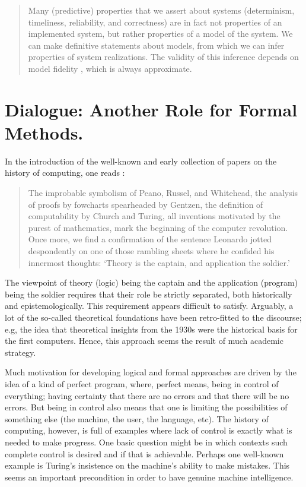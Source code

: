 \documentclass[]{article}
\begin{document}
\begin{quote}
	Many (predictive) properties that we assert about systems (determinism, timeliness, reliability, and correctness) are in fact not properties of an implemented system, but rather properties of a model of	the system.
	We can make definitive statements about
	models, from which we can infer properties of system realizations. The validity of this inference depends on model fidelity , which is always approximate.
\end{quote}



\section{Dialogue: Another Role for Formal Methods.}

{\color{red}{Passage inspired by Liesbeth}}


In the introduction of the well-known and early collection of papers on the
history of computing, one reads \cite[p???]{??}:

\begin{quote}
The improbable symbolism of Peano, Russel, and Whitehead, the
analysis of proofs by fowcharts spearheaded by Gentzen, the definition of computability by Church and Turing, all inventions motivated by the purest of mathematics, mark the beginning of the computer revolution. Once more, we find a confirmation of the sentence Leonardo jotted despondently on one of those rambling sheets where he confided his innermost thoughts: `Theory is the captain,
and application the soldier.'
\end{quote}

The viewpoint of theory (logic) being the captain and the application (program) being the soldier requires that their role be strictly separated, both historically and
epistemologically. This requirement appears difficult to satisfy. Arguably, a lot of the so-called theoretical foundations have been retro-fitted to the discourse; e.g, the idea that theoretical insights from the 1930s were the historical basis for the first computers. Hence, this approach seems the result of much academic strategy.

Much motivation for developing logical and formal approaches are driven by
the idea of a kind of perfect program, where, perfect means, being in control of
everything; having certainty that there are no errors and that there will be no
errors. But being in control also means that one is limiting the
possibilities of something else (the machine, the user, the language, etc).
The history of computing, however, is full of examples where lack of
control is exactly what is needed to make progress. One basic question might
be in which contexts such complete control is desired and if that is achievable.
Perhaps one well-known example is Turing's insistence on the machine's
ability to make mistakes. This seems an important precondition in order to
have genuine machine intelligence.
\end{document}
